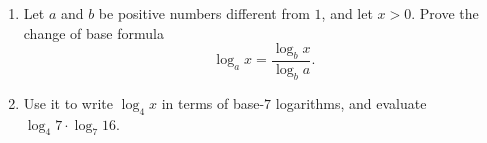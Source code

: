 \begin{enumerate}
\item[(a)] Let $a$ and $b$ be positive numbers different from $1$, and let $x>0$. Prove the change of base formula
\[
\log_a x=\dfrac{\log_b x}{\log_b a}.
\]
\item[(b)] Use it to write $\log_4 x$ in terms of base-$7$ logarithms, and evaluate $\log_4 7\cdot\log_7 16$.
\end{enumerate}
